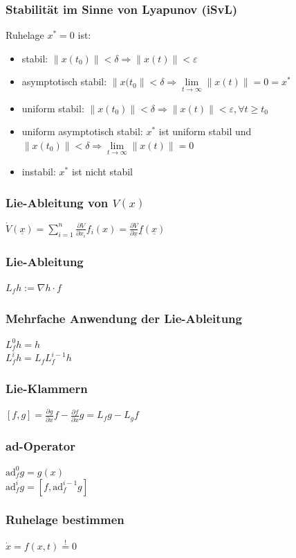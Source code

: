\documentclass[german]{latex4ei/latex4ei_sheet}
\begin{document}
\begin{sectionbox}
\subsubsection{Stabilität im Sinne von Lyapunov (iSvL)}
Ruhelage $x^* = 0$ ist:
\begin{itemize}
  \item stabil: $\|x(t_0)\| < \delta \Rightarrow \|x(t)\| < \varepsilon$
  \item asymptotisch stabil: $\|x(t_0\| < \delta \Rightarrow \lim\limits_{t \rightarrow \infty} \|x(t)\| = 0 = x^*$
  \item uniform stabil: $\|x(t_0)\| < \delta \Rightarrow \|x(t)\| < \varepsilon, \forall t \geq t_0$
  \item uniform asymptotisch stabil: $x^*$ ist uniform stabil und \\ $\|x(t_0)\| < \delta \Rightarrow \lim\limits_{t \rightarrow \infty} \|x(t)\| = 0$
  \item instabil: $x^*$ ist nicht stabil
\end{itemize}

\subsubsection{Lie-Ableitung von $V(x)$}
$\dot{V}(\underline{x}) = \sum\limits_{i=1}^{n} \frac{\partial V}{\partial x_i}f_i(x) = \frac{\partial V}{\partial \underline{x}} \underline{f}(\underline{x}) $

\subsubsection{Lie-Ableitung}
$L_f h := \nabla h \cdot f$

\subsubsection{Mehrfache Anwendung der Lie-Ableitung}
$L_f^0 h = h$ \\
$L_f^i h = L_f L_f^{i-1} h$

\subsubsection*{Lie-Klammern}
$\left[ f,g \right] = \frac{\partial g}{\partial x} f - \frac{\partial f}{\partial x} g = L_f g - L_g f$

\subsubsection*{ad-Operator}
$\text{ad}_f^0 g = g(x)$ \\
$\text{ad}_f^i g = \left[ f, \text{ad}_f^{i-1} g \right]$

\subsubsection*{Ruhelage bestimmen}
$\dot x = f(x,t) \overset{!}{=} 0$
\end{sectionbox}
\end{document}
